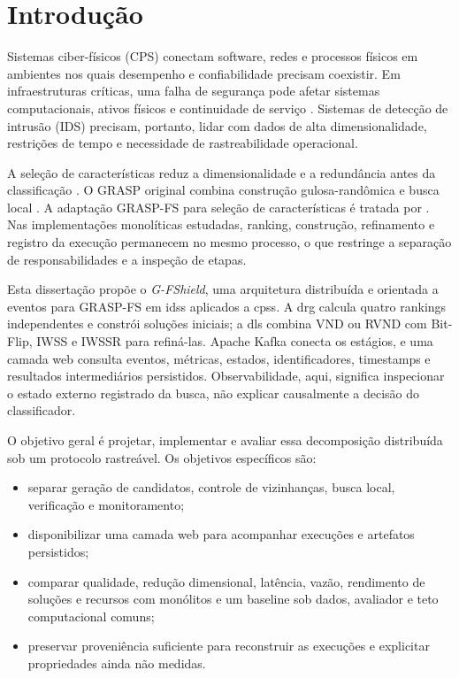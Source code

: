 \chapter{Introdução}
\label{chapter:introducao}

Sistemas ciber-físicos (CPS) conectam software, redes e processos físicos em ambientes nos quais desempenho e confiabilidade precisam coexistir. Em infraestruturas críticas, uma falha de segurança pode afetar sistemas computacionais, ativos físicos e continuidade de serviço \cite{Cardenas2009,Mitchell2014,Alcaraz2019}. Sistemas de detecção de intrusão (IDS) precisam, portanto, lidar com dados de alta dimensionalidade, restrições de tempo e necessidade de rastreabilidade operacional.

A seleção de características reduz a dimensionalidade e a redundância antes da classificação \cite{Hall1999,Saeys2007,guyon2003introduction}. O GRASP original combina construção gulosa-randômica e busca local \cite{ResendeRibeiro2010}. A adaptação GRASP-FS para seleção de características é tratada por . Nas implementações monolíticas estudadas, ranking, construção, refinamento e registro da execução permanecem no mesmo processo, o que restringe a separação de responsabilidades e a inspeção de etapas.

Esta dissertação propõe o \textit{G-FShield}, uma arquitetura distribuída e orientada a eventos para GRASP-FS em \acp{ids} aplicados a \acp{cps}. A \ac{drg} calcula quatro rankings independentes e constrói soluções iniciais; a \ac{dls} combina VND ou RVND com Bit-Flip, IWSS e IWSSR para refiná-las. Apache Kafka conecta os estágios, e uma camada web consulta eventos, métricas, estados, identificadores, timestamps e resultados intermediários persistidos. Observabilidade, aqui, significa inspecionar o estado externo registrado da busca, não explicar causalmente a decisão do classificador.

O objetivo geral é projetar, implementar e avaliar essa decomposição distribuída sob um protocolo rastreável. Os objetivos específicos são:

\begin{itemize}
  \item separar geração de candidatos, controle de vizinhanças, busca local, verificação e monitoramento;
  \item disponibilizar uma camada web para acompanhar execuções e artefatos persistidos;
  \item comparar qualidade, redução dimensional, latência, vazão, rendimento de soluções e recursos com monólitos e um baseline sob dados, avaliador e teto computacional comuns;
  \item preservar proveniência suficiente para reconstruir as execuções e explicitar propriedades ainda não medidas.
\end{itemize}

